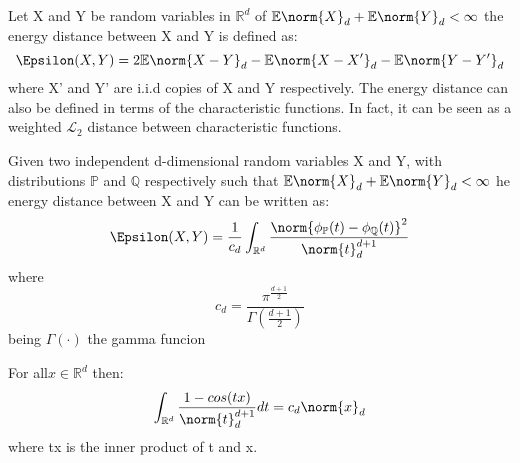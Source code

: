 \begin{defn}
Let X and Y be random variables in $\mathbb{R}^{d}$ of $\mathbb{E}\norm{X}_{d} + \mathbb{E}\norm{Y}_{d} < \infty$ the energy distance between X and Y is defined as:
\vspace{5mm}
$$\Epsilon(X,Y) = 2\mathbb{E}\norm{X-Y}_{d} - \mathbb{E}\norm{X-X'}_{d} - \mathbb{E}\norm{Y-Y'}_{d}$$
where X' and Y' are i.i.d copies of X and Y respectively.
The energy distance can also be defined in terms of the characteristic functions. In fact, it can be seen as a weighted $\mathcal{L}_{2}$ distance between characteristic functions.
\end{defn}
\begin{prop}
Given two independent d-dimensional random variables X and Y, with distributions $\mathbb{P}$ and $\mathbb{Q}$ respectively such that $\mathbb{E}\norm{X}_{d} + \mathbb{E}\norm{Y}_{d} < \infty$ he energy distance between X and Y can be written as:
\vspace{5mm}
$$\Epsilon(X,Y) = \frac{1}{c_{d}}\int_{\mathbb{R}^{d}}\frac{\norm{\phi_{\mathbb{P}}(t)-\phi_{\mathbb{Q}}(t)}^{2}}{\norm{t}^{d+1}_{d}}$$
where
$$c_{d} = \frac{\pi^{\frac{d+1}{2}}}{\Gamma(\frac{d+1}{2})}$$
being $\Gamma(\cdot)$ the gamma funcion
\end{prop}
\begin{lem}
For all$x \in \mathbb{R}^{d}$ then:
\vspace{5mm}
$$\int_{\mathbb{R}^{d}}\frac{1-cos(tx)}{\norm{t}^{d+1}_{d}} dt = c_{d}\norm{x}_{d}$$
where tx is the inner product of t and x.
\end{lem}

 